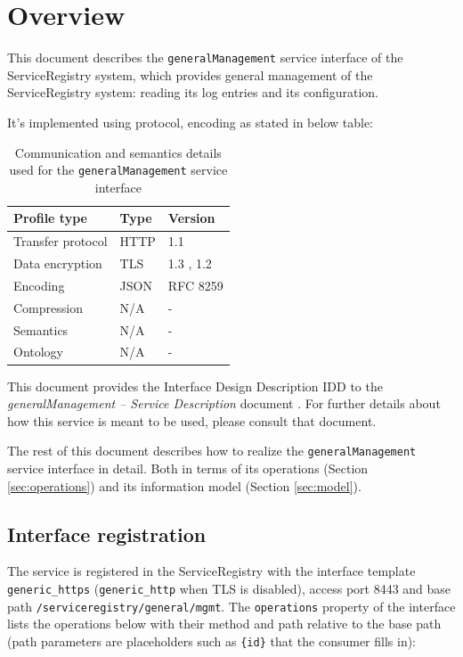 \documentclass[a4paper]{arrowhead}
\begin{document}
\section{Overview}
\label{sec:overview}

This document describes the \texttt{generalManagement} service interface of the ServiceRegistry system, which provides general management of the ServiceRegistry system: reading its log entries and its configuration.

It's implemented using protocol, encoding as stated in below table:
\begin{table}[ht!]
  \centering
  \begin{tabular}{|l|l|l|}
    \hline
    \rowcolor{gray!33} Profile type & Type & Version \\ \hline
    Transfer protocol & HTTP & 1.1 \cite{rfc9112} \\ \hline
    Data encryption & TLS & 1.3 \cite{rfc8446}, 1.2 \cite{rfc5246} \\ \hline
    Encoding & JSON & RFC 8259 \cite{rfc8259} \\ \hline
    Compression & N/A & - \\ \hline
    Semantics & N/A & - \\ \hline
    Ontology & N/A & - \\ \hline
  \end{tabular}
  \caption{Communication and semantics details used for the \texttt{generalManagement} service interface}
  \label{tab:comunication_semantics_profile}
\end{table}

This document provides the Interface Design Description IDD to the \textit{generalManagement -- Service Description} document \cite{sr-generalManagement-sd}.
For further details about how this service is meant to be used, please consult that document.

The rest of this document describes how to realize the \texttt{generalManagement} service
interface in detail. Both in terms of its operations (Section \ref{sec:operations}) and its information model (Section \ref{sec:model}).

\subsection{Interface registration}

The service is registered in the ServiceRegistry with the interface template \texttt{generic\_\allowbreak{}https} (\texttt{generic\_\allowbreak{}http} when TLS is disabled), access port 8443 and base path \texttt{/\allowbreak{}serviceregistry/\allowbreak{}general/\allowbreak{}mgmt}. The \texttt{operations} property of the interface lists the operations below with their method and path relative to the base path (path parameters are placeholders such as \texttt{\{id\}} that the consumer fills in):
\end{document}
